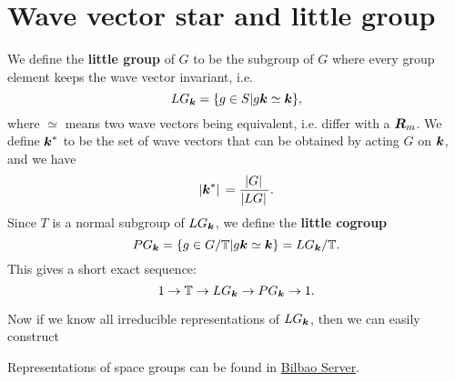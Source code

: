 \documentclass[hyperref, a4paper]{article}
\newcommand*{\concept}[1]{{\textbf{#1}}}
\begin{document}
\section{Wave vector star and little group}

We define the \concept{little group} of $G$ to be the subgroup of $G$ where every group element keeps 
the wave vector invariant, i.e. 
\begin{equation}
    LG_{\vb*{k}} = \{g \in S | g \vb*{k} \simeq \vb*{k} \},
\end{equation}
where $\simeq$ means two wave vectors being equivalent, i.e. differ with a $\vb*{R}_m$.
We define $\vb*{k}^*$ to be the set of wave vectors that can be obtained by acting $G$ on $\vb*{k}$, and we have 
\begin{equation}
    \abs*{\vb*{k}^*} = \frac{\abs*{G}}{\abs*{LG}}.
\end{equation}
Since $T$ is a normal subgroup of $LG_{\vb*{k}}$, we define the \concept{little cogroup} 
\begin{equation}
    P G_{\vb*{k}} = \{ g \in G / \mathbb{T} | g \vb*{k} \simeq \vb*{k} \} = LG_{\vb*{k}} / \mathbb{T}.
\end{equation}
This gives a short exact sequence: 
\begin{equation}
    1 \to \mathbb{T} \to LG_{\vb*{k}} \to PG_{\vb*{k}} \to 1.
\end{equation}

Now if we know all irreducible representations of $LG_{\vb*{k}}$, then we can easily construct 

Representations of space groups can be found in \href{https://www.cryst.ehu.es/}{Bilbao Server}. 
\end{document}
